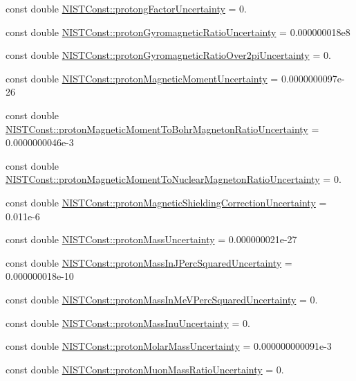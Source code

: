 \begin{DoxyCompactItemize}
\item 
const double \hyperlink{group___proton_ga0da65a4c99a5f1d339864c1f3e530a5b}{N\+I\+S\+T\+Const\+::protong\+Factor\+Uncertainty} = 0.
\item 
const double \hyperlink{group___proton_gaa71b7de7eab3c78be5f0fa7851d284e2}{N\+I\+S\+T\+Const\+::proton\+Gyromagnetic\+Ratio\+Uncertainty} = 0.\+000000018e8
\item 
const double \hyperlink{group___proton_ga107cde2344578ef79ee219b74184a25b}{N\+I\+S\+T\+Const\+::proton\+Gyromagnetic\+Ratio\+Over2pi\+Uncertainty} = 0.
\item 
const double \hyperlink{group___proton_ga4ea801fdf73e61bbf8e984c88a50dabb}{N\+I\+S\+T\+Const\+::proton\+Magnetic\+Moment\+Uncertainty} = 0.\+0000000097e-\/26
\item 
const double \hyperlink{group___proton_gae14639315fdecf1e78b18de5468b8acf}{N\+I\+S\+T\+Const\+::proton\+Magnetic\+Moment\+To\+Bohr\+Magneton\+Ratio\+Uncertainty} = 0.\+0000000046e-\/3
\item 
const double \hyperlink{group___proton_gaa4c8406d5e6355f61b1c78ad5f85cda1}{N\+I\+S\+T\+Const\+::proton\+Magnetic\+Moment\+To\+Nuclear\+Magneton\+Ratio\+Uncertainty} = 0.
\item 
const double \hyperlink{group___proton_ga5a9d8dc245061602b0193dd808d54ffc}{N\+I\+S\+T\+Const\+::proton\+Magnetic\+Shielding\+Correction\+Uncertainty} = 0.\+011e-\/6
\item 
const double \hyperlink{group___proton_ga14f058f91a60fc3dff5e707b28b3f737}{N\+I\+S\+T\+Const\+::proton\+Mass\+Uncertainty} = 0.\+000000021e-\/27
\item 
const double \hyperlink{group___proton_ga192b0caed878dce33d9f2f05470577d0}{N\+I\+S\+T\+Const\+::proton\+Mass\+In\+J\+Perc\+Squared\+Uncertainty} = 0.\+000000018e-\/10
\item 
const double \hyperlink{group___proton_gac4e3bb5aa0cf6f869efc7fcb6c691dab}{N\+I\+S\+T\+Const\+::proton\+Mass\+In\+Me\+V\+Perc\+Squared\+Uncertainty} = 0.
\item 
const double \hyperlink{group___proton_ga7746baf347356a9021e5493c88a05df2}{N\+I\+S\+T\+Const\+::proton\+Mass\+Inu\+Uncertainty} = 0.
\item 
const double \hyperlink{group___proton_gaac054defc21692cb5ce9ed0508c44b42}{N\+I\+S\+T\+Const\+::proton\+Molar\+Mass\+Uncertainty} = 0.\+000000000091e-\/3
\item 
const double \hyperlink{group___proton_gacdd50f0c4b94c56fd5b1b8064cbe6286}{N\+I\+S\+T\+Const\+::proton\+Muon\+Mass\+Ratio\+Uncertainty} = 0.

\end{DoxyCompactItemize}
